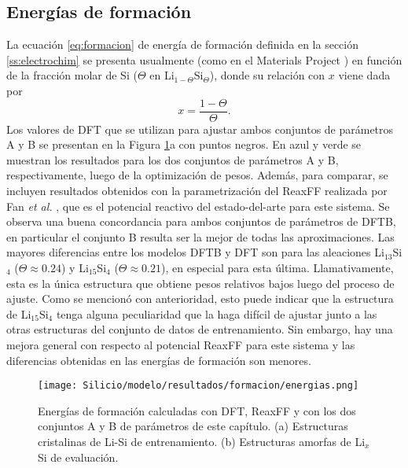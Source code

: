 \subsection{Energías de formación}

La ecuación \ref{eq:formacion} de energía de formación definida en la 
sección \ref{ss:electrochim} se presenta usualmente (como en el Materials 
Project \cite{materials_project}) en función de la fracción molar de Si 
($\Theta$ en Li$_{1-\Theta}$Si$_\Theta$), donde su relación con $x$ viene
dada por
\begin{equation}
	x = \frac{1 - \Theta}{\Theta}.
\end{equation}
Los valores de DFT que se utilizan para ajustar ambos conjuntos de parámetros
A y B se presentan en la Figura \ref{fig:eform}a con puntos negros. En azul
y verde se muestran los resultados para los dos conjuntos de parámetros A y B, respectivamente, 
luego de la optimización de pesos. Además, para comparar, se incluyen resultados
obtenidos con la parametrización del ReaxFF realizada por Fan \textit{et al.}
\cite{fan2013}, que es el potencial reactivo del estado-del-arte para este sistema. 
Se observa una buena concordancia para ambos conjuntos de parámetros
de DFTB, en particular el conjunto B resulta ser la mejor de todas las
aproximaciones. Las mayores diferencias entre los modelos DFTB y DFT son para las
aleaciones Li$_{13}$Si$_4$ ($\Theta \approx 0.24$) y Li$_{15}$Si$_4$
($\Theta \approx 0.21$), en especial para esta última. Llamativamente, esta es
la única estructura que obtiene pesos relativos bajos luego del proceso de
ajuste. Como se mencionó con anterioridad, esto puede indicar que la estructura
de Li$_{15}$Si$_4$ tenga alguna peculiaridad que la haga difícil de ajustar
junto a las otras estructuras del conjunto de datos de entrenamiento. Sin
embargo, hay una mejora general con respecto al potencial ReaxFF para este
sistema y las diferencias obtenidas en las energías de formación son menores.
\begin{figure}[h!]
	\centering
	\texttt{[image: Silicio/modelo/resultados/formacion/energias.png]}
	\caption{Energías de formación calculadas con DFT, ReaxFF y con los dos
	conjuntos A y B de parámetros de este capítulo. (a) Estructuras cristalinas
	de Li-Si de entrenamiento. (b) Estructuras amorfas de Li$_x$Si de evaluación.}
	\label{fig:eform}
\end{figure}

